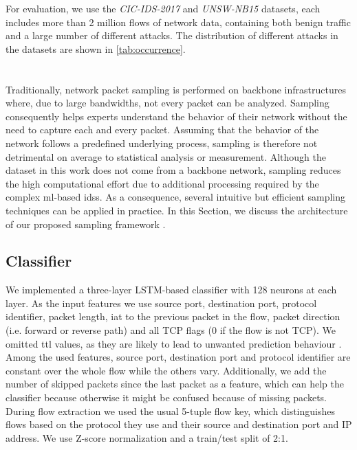 \documentclass[conference]{IEEEtran}
\begin{document}
For evaluation, we use the \textit{CIC-IDS-2017} \cite{sharafaldin_toward_2018} and \textit{UNSW-NB15} \cite{moustafa_unsw-nb15_2015} datasets, each includes more than 2 million flows of network data, containing both benign traffic and a large number of different attacks. The distribution of different attacks in the datasets are shown in \autoref{tab:occurrence}.

\section{\ours{}}

Traditionally, network packet sampling is performed on backbone infrastructures where, due to large bandwidths, not every packet can be analyzed. Sampling consequently helps experts understand the behavior of their network without the need to capture each and every packet. Assuming that the behavior of the network follows a predefined underlying process, sampling is therefore not detrimental on average to statistical analysis or measurement. Although the dataset in this work does not come from a backbone network, sampling reduces the high computational effort due to additional processing required by the complex \gls{ml}-based \glspl{ids}. As a consequence, several intuitive but efficient sampling techniques can be applied in practice. In this Section, we discuss the architecture of our proposed sampling framework \ours.

\subsection{Classifier}
\label{subsec:classifier}
We implemented a three-layer LSTM-based classifier with 128 neurons at each layer. As the input features we use source port, destination port, protocol identifier, packet length, \gls{iat} to the previous packet in the flow, packet direction (i.e. forward or reverse path) and all TCP flags (0 if the flow is not TCP).
We omitted \gls{ttl} values, as they are likely to lead to unwanted prediction behaviour \cite{bachl_walling_2019}.  Among the used features, source port, destination port and protocol identifier are constant over the whole flow while the others vary.
Additionally, we add the number of skipped packets since the last packet as a feature, which can help the classifier because otherwise it might be confused because of missing packets.
During flow extraction we used the usual 5-tuple flow key, which distinguishes flows based on the protocol they use and their source and destination port and IP address.
We use Z-score normalization and a train/test split of 2:1.
\end{document}
